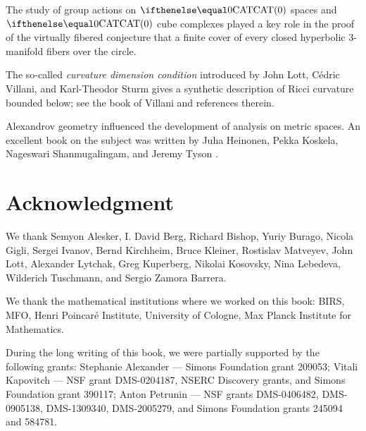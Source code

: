The study of group actions on $\CAT 0$ spaces and $\CAT 0$ cube complexes played a key role in the proof of the virtually fibered conjecture that a finite cover of  every closed hyperbolic 3-manifold fibers over the circle.

The so-called {}\emph{curvature dimension condition} introduced by John Lott, C\'edric Villani, and Karl-Theodor Sturm gives a synthetic description of Ricci curvature bounded below; see the book of Villani \cite{villani} and references therein.

Alexandrov geometry influenced the development of analysis on metric spaces. 
An excellent book on the subject was written by Juha Heinonen, Pekka Koskela, Nageswari Shanmugalingam, and Jeremy Tyson \cite{heinonen-koskela-shanmugalingam-tyson}.

\section*{Acknowledgment}
We thank 
Semyon Alesker,
I. David Berg,
Richard Bishop, 
Yuriy Burago, 
Nicola Gigli,
Sergei Ivanov,
Bernd Kirchheim, 
Bruce Kleiner, 
Rostislav Matveyev,
John Lott,
Alexander Lytchak, 
Greg Kuperberg, 
Nikolai Kosovsky, 
Nina Lebedeva,
Wilderich Tuschmann, 
and
Sergio Zamora Barrera.

We thank the mathematical institutions where we worked on this book: 
BIRS, 
MFO, 
Henri Poincar\'{e} Institute,
University of Cologne, 
Max Planck Institute for Mathematics.


During the long writing of this book, we were partially supported by the following grants:
Stephanie Alexander --- 
Simons Foundation grant 209053;
Vitali Kapovitch ---  NSF grant DMS-0204187, NSERC Discovery grants, and Simons Foundation grant 390117;
Anton Petrunin --- 
NSF grants
DMS-0406482,
DMS-0905138,
DMS-1309340,
DMS-2005279,
and Simons Foundation grants 
245094 and 584781.

